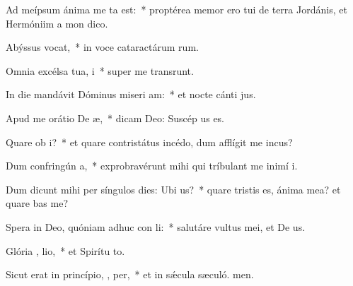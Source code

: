 \item Ad meípsum ánima me ta est:~* proptérea memor ero tui de terra Jordánis, et Hermóniim a mon dico.
\item Abýssus  vocat,~* in voce cataractárum rum.
\item Omnia excélsa tua,   i~* super me transrunt.
\item In die mandávit Dóminus miseri am:~* et nocte cánti jus.
\item Apud me orátio De  æ,~* dicam Deo: Suscép us es.
\item Quare ob  i?~* et quare contristátus incédo, dum afflígit me incus?
\item Dum confringún  a,~* exprobravérunt mihi qui tríbulant me inimí i.
\item Dum dicunt mihi per síngulos dies: Ubi   us?~* quare tristis es, ánima mea? et quare bas me?
\item Spera in Deo, quóniam adhuc con li:~* salutáre vultus mei, et De us.
\item Glória ,  lio,~* et Spirítu to.
\item Sicut erat in princípio,  ,  per,~* et in sǽcula sæculó. men.
